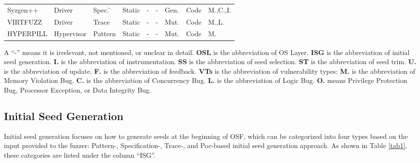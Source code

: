 \begin{footnotesize}
\begin{longtable}{m{1.8cm}m{1.3cm}m{0.6cm}m{1.6cm}m{1.0cm}m{0.8cm}m{0.9cm}m{1.3cm}m{0.5cm}}
        Syzgen++\cite{Chen2024SyzGen++} & Driver & Spec.' & Static & - & - & Gen. & Code & M.,C.,I.\\

        VIRTFUZZ\cite{Huster2024ToBoldly} & Driver & Trace & Static & - & - & Mut. & Code & M.,L.\\

        HYPERPILL\cite{Bulekov2024HYPERPILLFF} & Hypervisor & Pattern & Static & - & - & Mut. & Code & M. \\

        
        \end{longtable}
        \vspace{-0.4cm}
        \begin{flushleft}
        \justifying
        A “-” means it is irrelevant, not mentioned, or unclear in detail.
        \textbf{OSL} is the abbreviation of OS Layer. 
        \textbf{ISG} is the abbreviation of initial seed generation.
        \textbf{I.} is the abbreviation of instrumentation.
        \textbf{SS} is the abbreviation of seed selection.
        \textbf{ST} is the abbreviation of seed trim.
        \textbf{U.} is the abbreviation of update.
        \textbf{F.} is the abbreviation of feedback.
        \textbf{VTs} is the abbreviation of vulnerability types: \textbf{ M.} is the abbreviation of Memory Violation Bug. \textbf{C.} is the abbreviation of Concurrency Bug. \textbf{L.} is the abbreviation of Logic Bug. \textbf{O.} means Privilege Protection Bug, Processor Exception, or Data Integrity Bug.
        \end{flushleft}
        \end{footnotesize}
        

\subsection{Initial Seed Generation}

Initial seed generation focuses on how to generate seeds at the beginning of OSF, which can be categorized into four types based on the input provided to the fuzzer: Pattern-, Specification-, Trace-, and Poc-based initial seed generation approach. As shown in Table \ref{tab1}, these categories are listed under the column ``ISG''.

